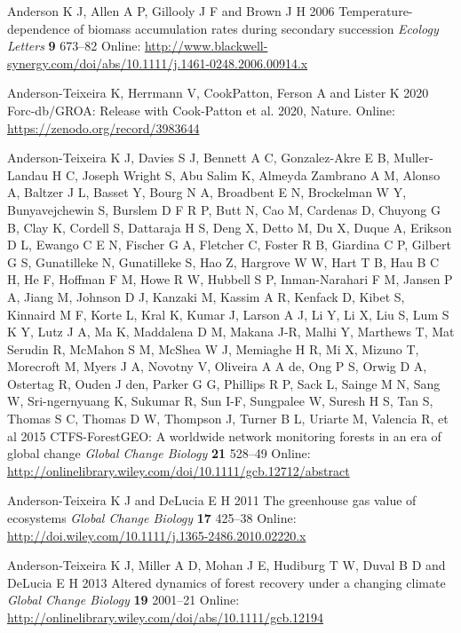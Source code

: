 \documentclass[
]{article}
\newlength{\cslhangindent}
\newenvironment{cslreferences}%
  {\setlength{\parindent}{0pt}%
  \everypar{\setlength{\hangindent}{\cslhangindent}}\ignorespaces}%
  {\par}
\begin{document}
\begin{cslreferences}
\leavevmode\hypertarget{ref-anderson_temperature-dependence_2006}{}%
Anderson K J, Allen A P, Gillooly J F and Brown J H 2006
Temperature-dependence of biomass accumulation rates during secondary
succession \emph{Ecology Letters} \textbf{9} 673--82 Online:
\url{http://www.blackwell-synergy.com/doi/abs/10.1111/j.1461-0248.2006.00914.x}

\leavevmode\hypertarget{ref-anderson-teixeira_forc-dbgroa_2020}{}%
Anderson-Teixeira K, Herrmann V, CookPatton, Ferson A and Lister K 2020
Forc-db/GROA: Release with Cook-Patton et al. 2020, Nature. Online:
\url{https://zenodo.org/record/3983644}

\leavevmode\hypertarget{ref-anderson-teixeira_ctfs-forestgeo_2015}{}%
Anderson-Teixeira K J, Davies S J, Bennett A C, Gonzalez-Akre E B,
Muller-Landau H C, Joseph Wright S, Abu Salim K, Almeyda Zambrano A M,
Alonso A, Baltzer J L, Basset Y, Bourg N A, Broadbent E N, Brockelman W
Y, Bunyavejchewin S, Burslem D F R P, Butt N, Cao M, Cardenas D, Chuyong
G B, Clay K, Cordell S, Dattaraja H S, Deng X, Detto M, Du X, Duque A,
Erikson D L, Ewango C E N, Fischer G A, Fletcher C, Foster R B, Giardina
C P, Gilbert G S, Gunatilleke N, Gunatilleke S, Hao Z, Hargrove W W,
Hart T B, Hau B C H, He F, Hoffman F M, Howe R W, Hubbell S P,
Inman-Narahari F M, Jansen P A, Jiang M, Johnson D J, Kanzaki M, Kassim
A R, Kenfack D, Kibet S, Kinnaird M F, Korte L, Kral K, Kumar J, Larson
A J, Li Y, Li X, Liu S, Lum S K Y, Lutz J A, Ma K, Maddalena D M, Makana
J-R, Malhi Y, Marthews T, Mat Serudin R, McMahon S M, McShea W J,
Memiaghe H R, Mi X, Mizuno T, Morecroft M, Myers J A, Novotny V,
Oliveira A A de, Ong P S, Orwig D A, Ostertag R, Ouden J den, Parker G
G, Phillips R P, Sack L, Sainge M N, Sang W, Sri-ngernyuang K, Sukumar
R, Sun I-F, Sungpalee W, Suresh H S, Tan S, Thomas S C, Thomas D W,
Thompson J, Turner B L, Uriarte M, Valencia R, et al 2015
CTFS-ForestGEO: A worldwide network monitoring forests in an era of
global change \emph{Global Change Biology} \textbf{21} 528--49 Online:
\url{http://onlinelibrary.wiley.com/doi/10.1111/gcb.12712/abstract}

\leavevmode\hypertarget{ref-anderson-teixeira_greenhouse_2011}{}%
Anderson-Teixeira K J and DeLucia E H 2011 The greenhouse gas value of
ecosystems \emph{Global Change Biology} \textbf{17} 425--38 Online:
\url{http://doi.wiley.com/10.1111/j.1365-2486.2010.02220.x}

\leavevmode\hypertarget{ref-andersonteixeira_altered_2013}{}%
Anderson‐Teixeira K J, Miller A D, Mohan J E, Hudiburg T W, Duval B D
and DeLucia E H 2013 Altered dynamics of forest recovery under a
changing climate \emph{Global Change Biology} \textbf{19} 2001--21
Online: \url{http://onlinelibrary.wiley.com/doi/abs/10.1111/gcb.12194}


\end{cslreferences}
\end{document}
